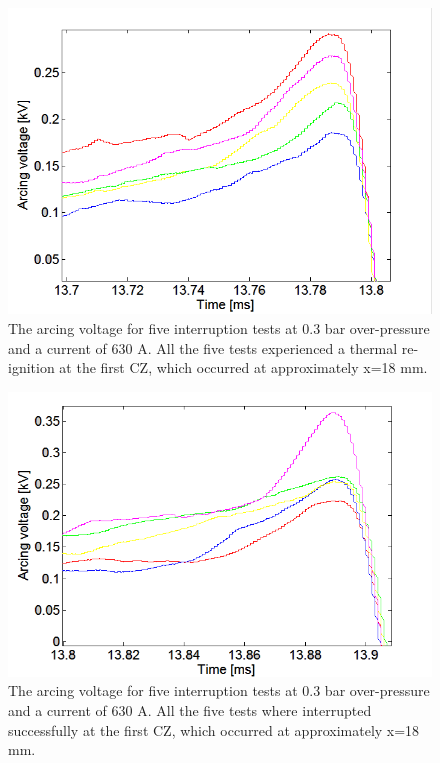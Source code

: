 \documentclass[10pt,b5paper,twoside]{article}
\begin{document}
\begin{figure}[H]
\centering
\includegraphics[scale=0.6, angle =0 ]{Bilder/Results/ArcingVoltage_18_reIgnition.PNG}
\caption{The arcing voltage for five interruption tests at 0.3 bar over-pressure and a current of 630 A. All the five tests experienced a thermal re-ignition at the first CZ, which occurred at approximately  x=18 mm.} \label{fig:18mmUnSuccessful}
\end{figure}

\begin{figure}[H]
\centering
\includegraphics[scale=0.6, angle =0 ]{Bilder/Results/ArcingVoltage_18_none_reIgnition.PNG}
\caption{The arcing voltage for five interruption tests at 0.3 bar over-pressure and a current of 630 A. All the five tests where interrupted successfully at the first CZ, which occurred at approximately  x=18 mm.} \label{fig:18mmSuccessful}
\end{figure}
\end{document}
